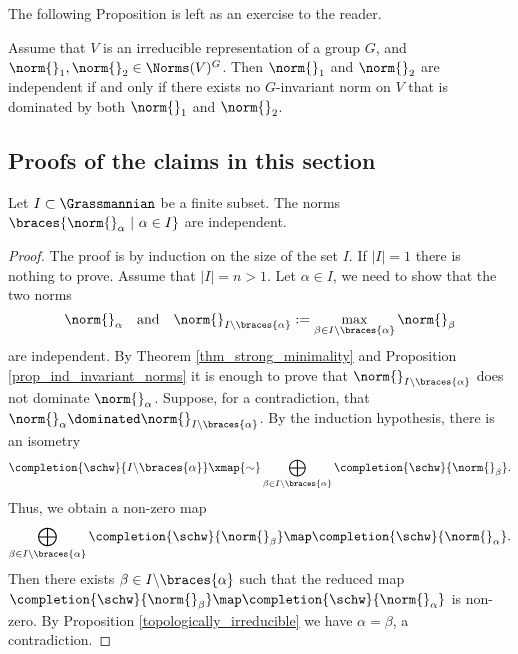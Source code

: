 The following Proposition is left as an exercise to the reader.
\begin{prop}\label{prop_ind_invariant_norms}
Assume that $V$ is an irreducible representation of a group $G$, and $\norm{}_1,\norm{}_2\in\Norms(V)^G$.
Then $\norm{}_1$ and $\norm{}_2$ are independent if and only if there exists no $G$-invariant norm on $V$ that is dominated by both $\norm{}_1$ and $\norm{}_2$.
\end{prop} 



\subsection{Proofs of the claims in this section}

\begin{prop}\label{prop_independence_minimal_norms}
Let $I\subset \Grassmannian$ be a finite subset.
The norms $\braces{\norm{}_\alpha\ |\ \alpha\in I}$ are independent.
\end{prop} 
    \begin{proof}
    The proof is by induction on the size of the set $I$.
    If $|I|=1$ there is nothing to prove.
    Assume that $|I|=n>1$.
    Let $\alpha\in I$, we need to show that the two norms
    \[\norm{}_\alpha\ \ \ \text{and}\ \ \ \norm{}_{I\backslash\braces{\alpha}}:=\max_{\beta\in I\backslash\braces{\alpha}}\norm{}_\beta\]
    are independent.
    By Theorem \ref{thm_strong_minimality} and Proposition \ref{prop_ind_invariant_norms} it is enough to prove that $\norm{}_{I\backslash\braces{\alpha}}$ does not dominate $\norm{}_\alpha$.
    Suppose, for a contradiction, that $\norm{}_\alpha \dominated \norm{}_{I\backslash\braces{\alpha}}$.
    By the induction hypothesis, there is an isometry
    \[\completion{\schw}{I\backslash\braces{\alpha}}\xmap{\sim} \bigoplus_{\beta\in I\backslash\braces{\alpha}}\completion{\schw}{\norm{}_\beta}.\]
    Thus, we obtain a non-zero map 
    \[\bigoplus_{\beta\in I\backslash\braces{\alpha}}\completion{\schw}{\norm{}_\beta}\map \completion{\schw}{\norm{}_\alpha}.\]
    Then there exists $\beta\in I\backslash\braces{\alpha}$ such that the reduced map $\completion{\schw}{\norm{}_\beta}\map \completion{\schw}{\norm{}_\alpha}$ is non-zero.
    By Proposition \ref{topologically_irreducible} we have $\alpha=\beta$, a contradiction.    
    \end{proof} 

